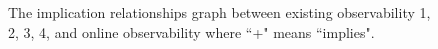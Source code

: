 \begin{figure}[thpb]
      \centering
      
      \caption{The implication relationships graph between existing observability 1, 2, 3, 4, and online observability where ``+" means ``implies".}
      \label{fig:7}
   \end{figure}
   
